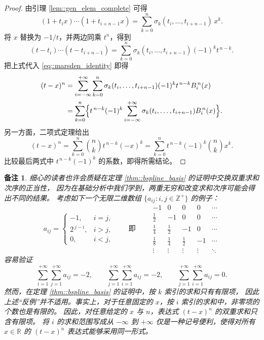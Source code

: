 \documentclass[a4paper]{ctexart}
\newtheorem{remark}{备注}
\numberwithin{theorem}{section}
\numberwithin{equation}{section}
\numberwithin{figure}{section}
\numberwithin{remark}{section}
\begin{document}
\begin{proof}
由引理 \ref{lem::gen_elem_complete} 可得
\[
(1+t_i x)\cdots(1+t_{i+n-1}x)=\sum_{k=0}^{n}\sigma_k(t_i,\ldots,t_{i+n-1})\,x^{k}.
\]
将 $x$ 替换为 $-1/t$，并两边同乘 $t^{n}$，得到
\[
(t-t_i)\cdots(t-t_{i+n-1})=\sum_{k=0}^{n}\sigma_k(t_i,\ldots,t_{i+n-1})(-1)^{k}t^{\,n-k}.
\]
把上式代入 \eqref{eq::marsden_identity} 即得
\[
\begin{aligned}
(t-x)^{n}
&=\sum_{i=-\infty}^{+\infty}\sum_{k=0}^{n}\sigma_k(t_i,\ldots,t_{i+n-1})(-1)^{k}t^{\,n-k}B^{\,n}_i(x)\\ 
&=\sum_{k=0}^{n}\Bigl\{t^{\,n-k}(-1)^{k}\sum_{i=-\infty}^{+\infty}\sigma_k(t_i,\ldots,t_{i+n-1})B^{\,n}_i(x)\Bigr\}.
\end{aligned}
\]
另一方面，二项式定理给出
\[
(t-x)^{n}=\sum_{k=0}^{n}\binom{n}{k}t^{\,n-k}(-x)^{k}
=\sum_{k=0}^{n}t^{\,n-k}(-1)^{k}\binom{n}{k}x^{k}.
\]
比较最后两式中 $t^{\,n-k}(-1)^{k}$ 的系数，即得所需结论。
\end{proof}

\begin{remark}
    \label{rem::double_sum_order}
细心的读者也许会质疑在定理 \ref{thm::bspline_basis} 的证明中交换双重求和次序的正当性，
因为在基础分析中我们学到，两重无穷和改变求和次序可能会得出不同的结果。
考虑如下一个无限二维数组 $\{a_{ij}: i,j\in\mathbb{Z}^{+}\}$ 的例子：
\[
a_{ij}=
\begin{cases}
-1, & i=j,\\
2^{\,j-i}, & i>j,\\
0, & i<j,
\end{cases}
\qquad\text{即}\qquad
\begin{array}{cccccc}
-1 & 0 & 0 & 0 & \cdots\\
\frac12 & -1 & 0 & 0 & \cdots\\
\frac14 & \frac12 & -1 & 0 & \cdots\\
\frac18 & \frac14 & \frac12 & -1 & \cdots\\
\vdots & \vdots & \vdots & \vdots & \ddots
\end{array}
\]
容易验证
\[
\sum_{i=1}^{+\infty}\sum_{j=1}^{+\infty}a_{ij}=-2,\qquad
\sum_{j=1}^{+\infty}\sum_{i=1}^{+\infty}a_{ij}=-2,\qquad
\sum_{j=1}^{+\infty}\sum_{i=1}^{+\infty}a_{ij}=0.
\]
然而，在定理 \ref{thm::bspline_basis} 的证明中，按 $k$ 索引的求和只有有限项，
因此上述“反例”并不适用。事实上，对于任意固定的 $x$，按 $i$ 索引的求和中，非零项的个数也是有限的。
因此，对任意给定的 $x$ 与 $n$，表达式 $(t-x)^{n}$ 的双重求和只含有限项。
将 $i$ 的求和范围写成从 $-\infty$ 到 $+\infty$ 仅是一种记号便利，使得对所有 $x\in\mathbb{R}$ 的 $(t-x)^{n}$ 表达式能够采用同一形式。
\end{remark}
\end{document}
